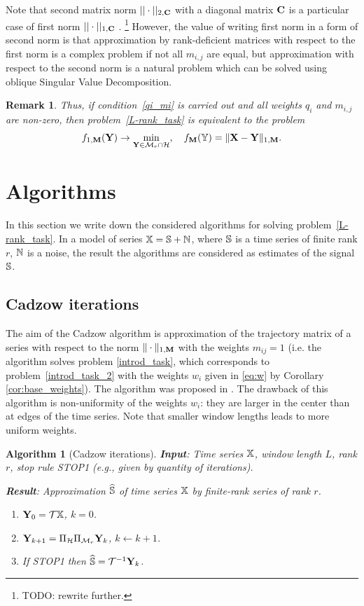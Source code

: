 \documentclass[sii]{ipart}
\newtheorem{algorithm}{Algorithm}
\newtheorem{remark}{Remark}
\begin{document}
Note that second matrix norm $||\cdot||_{2, \mathbf{C}}$ with a diagonal matrix $\mathbf{C}$ is a particular case of first norm $||\cdot||_{1, \mathbf{C}}$ . \footnote{TODO: rewrite further.} However, the value of writing first norm in a form of second norm is that approximation by rank-deficient matrices with respect to the first norm is a complex problem if not all $m_{i,j}$ are equal, but approximation with respect to the second norm is a natural problem which can be solved using oblique Singular Value Decomposition.

\begin{remark}
	\label{rem:2tasks}
	Thus, if condition~\eqref{qi_mi} is carried out and all weights $q_i$ and $m_{i,j}$ are non-zero, then problem~\eqref{L-rank_task}
	is equivalent to the problem
	\begin{equation}
	\label{rank_task}
	f_{1,\bfM}(\bfY) \to \min_{\bfY \in \calM_r \cap \calH}, \quad f_\bfM(\tsY) = \|\bfX-\bfY\|_{1,\bfM}.
	\end{equation}
\end{remark}

\section{Algorithms}
\label{sec:alg}
In this section we write down the considered algorithms for solving problem~\eqref{L-rank_task}.
In a model of series $\mathbb{X}=\mathbb{S}+\mathbb{N}$, where $\mathbb{S}$ is a time series of finite rank $r$, $\mathbb{N}$ is a noise, the result the algorithms are considered as estimates of the signal $\mathbb{S}$.

\subsection{Cadzow iterations}
The aim of the Cadzow algorithm is approximation of the trajectory matrix of a series with respect to the norm $\|\cdot\|_{1, \mathbf{M}}$ with the weights $m_{ij}=1$ (i.e. the algorithm solves problem \eqref{introd_task}, which corresponds to problem~\eqref{introd_task_2} with the weights $w_i$ given in \eqref{eq:w} by Corollary \ref{cor:base_weights}). The algorithm was proposed in \cite{Cadzow1988}. The drawback of this algorithm is non-uniformity of the weights $w_i$: they are larger in the center than at edges of the time series. Note that smaller window lengths leads to more uniform weights.

\begin{algorithm}[Cadzow iterations]
	\textbf{Input}: Time series $\mathbb{X}$, window length $L$, rank $r$,
	stop rule STOP1 (e.g., given by quantity of iterations).
	
	\textbf{Result}:
	Approximation $\widehat{\mathbb{S}}$ of time series $\mathbb{X}$ by finite-rank series of rank $r$.
	
	\begin{enumerate}
		\item
		$\mathbf{Y}_0 = \mathcal{T} \mathbb{X}$, $k=0$.
		\item
		$\mathbf{Y}_{k+1} = \Pi_{\mathcal{H}}  \Pi_{\mathcal{M}_r} \mathbf{Y}_{k}$, $k\leftarrow k+1$.
		\item
		If STOP1 then $\widehat{\mathbb{S}} = \mathcal{T}^{-1} \mathbf{Y}_k$.
	\end{enumerate}
\end{algorithm}
\end{document}

